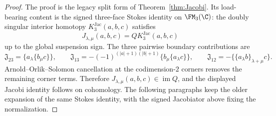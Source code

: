 \begin{proof}
The proof is the legacy split form of Theorem~\ref{thm:Jacobi}.  Its
load-bearing content is the signed three-face Stokes identity on
\(\FM_3(\C)\): the doubly singular interior homotopy
\(K_3^{\mathrm{Jac}}(a,b,c)\) satisfies
\[
J_{\lambda,\mu}(a,b,c)=QK_3^{\mathrm{Jac}}(a,b,c)
\]
up to the global suspension sign. The three pairwise boundary
contributions are
\[
\mathfrak J_{23}=\{a_\lambda\{b_\mu c\}\},\qquad
\mathfrak J_{13}=
-(-1)^{(|a|+1)(|b|+1)}\{b_\mu\{a_\lambda c\}\},\qquad
\mathfrak J_{12}=-\{\{a_\lambda b\}_{\lambda+\mu}c\}.
\]
Arnold--Orlik--Solomon cancellation at the codimension-\(2\) corners
removes the remaining corner terms. Therefore
\(J_{\lambda,\mu}(a,b,c)\in\operatorname{im}Q\), and the displayed
Jacobi identity follows on cohomology.  The following paragraphs keep
the older expansion of the same Stokes identity, with the signed
Jacobiator above fixing the normalization.


\end{proof}
